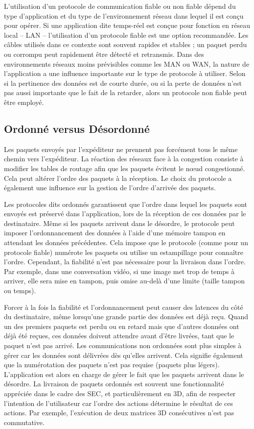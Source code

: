 L'utilisation d'un protocole de communication fiable ou non fiable dépend du 
type d'application et du type de l'environnement réseau dans lequel il est conçu 
pour opérer. Si une application dite temps-réel est conçue pour fonction en réseau 
local -- \gls{LAN} -- l'utilisation d'un protocole fiable est une option recommandée. 
Les câbles utilisés dans ce contexte sont souvent rapides et stables ; un paquet 
perdu ou corrompu peut rapidement être détecté et retransmis. Dans des 
environnements réseaux moins prévisibles comme les \gls{MAN} ou 
\gls{WAN}, la nature de l'application a une influence importante sur le type de 
protocole à utiliser. Selon si la pertinence des données est de courte durée, ou si 
la perte de données n'est pas aussi importante que le fait de la retarder, alors un 
protocole non fiable peut être employé.


\subsection{Ordonné versus Désordonné}
\label{sec:ordre}
Les paquets envoyés par l'expéditeur ne prennent pas forcément tous le même 
chemin vers l'expéditeur. La réaction des réseaux face à la congestion consiste à 
modifier les tables de routage afin que les paquets évitent le n\oe ud congestionné. 
Cela peut altérer l'ordre des paquets à la réception. Le choix du protocole a 
également une influence sur la gestion de l'ordre d'arrivée des paquets.

Les protocoles dits \og ordonnés\fg{} garantissent que l'ordre dans lequel les 
paquets sont envoyés est préservé dans l'application, lors de la réception de ces 
données par le destinataire. Même si les paquets arrivent dans le désordre, le 
protocole peut imposer l'ordonnancement des données à l'aide d'une mémoire 
tampon en attendant les données précédentes. Cela impose que le protocole 
(comme pour un protocole fiable) numérote les paquets ou utilise un estampillage 
pour connaître l'ordre. Cependant, la fiabilité n'est pas nécessaire pour la livraison 
dans l'ordre. Par exemple, dans une conversation vidéo, si une image met trop de 
temps à arriver, elle sera mise en tampon, puis omise au-delà d'une limite (taille 
tampon ou temps).

Forcer à la fois la fiabilité et l'ordonnancement peut causer des latences du côté 
du destinataire, même lorsqu'une grande partie des données est déjà reçu. Quand 
un des premiers paquets est perdu ou en retard mais que d'autres données ont 
déjà été reçues, ces données doivent attendre avant d'être livrées, tant que le 
paquet n'est pas arrivé. Les communications non ordonnées sont plus simples à 
gérer car les données sont délivrées dès qu'elles arrivent. Cela signifie également 
que la numérotation des paquets n'est pas requise (paquets plus légers). 
L'application est alors en charge de gérer le fait que les paquets arrivent dans le 
désordre. La livraison de paquets ordonnés est souvent une fonctionnalité 
appréciée dans le 
cadre des \gls{SEC}, et particulièrement en 3D, afin de respecter l'intention de 
l'utilisateur car l'ordre des actions détermine le résultat de ces actions. Par 
exemple, l'exécution de deux matrices 3D consécutives n'est pas commutative.

